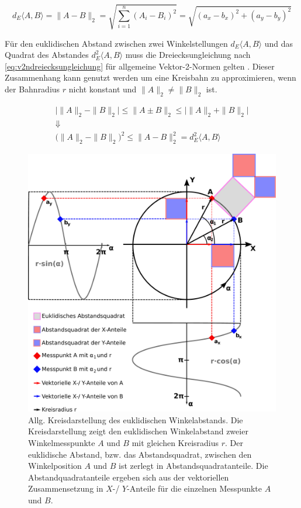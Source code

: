 \begin{equation}\label{eq:euklidischerabstand}
	d_E\langle A,B \rangle = \|A - B\|_2 = \sqrt{\sum_{i=1}^{n}(A_i - B_i)^2} = \sqrt{(a_x - b_x)^2 + (a_y - b_y)^2}
\end{equation}


\clearpage


Für den euklidischen Abstand zwischen zwei Winkelstellungen $d_E\langle A,B \rangle$ und das Quadrat des Abstandes 
$d_E^2\langle A,B \rangle$ muss die Dreiecksungleichung nach \autoref{eq:v2ndreiecksungleichung} für allgemeine 
Vektor-2-Normen gelten \cite{vandeGeijn2014}. Dieser Zusammenhang kann genutzt werden um eine Kreisbahn zu 
approximieren, wenn der Bahnradius $r$ nicht konstant und $\|A\|_2 \ne \|B\|_2$ ist. 


\begin{equation}\label{eq:v2ndreiecksungleichung}
	\begin{gathered}
	\big|\|A\|_2 - \|B\|_2\big| \le \|A \pm B\|_2 \le \big|\|A\|_2 + \|B\|_2\big| \\
	\Downarrow \\
	\big(\|A\|_2 - \|B\|_2\big)^2 \le \|A - B\|_2^2 = d_E^2\langle A,B \rangle
	\end{gathered}
\end{equation}


\begin{figure}[tbph]
	\centering
	\includegraphics[width=0.7\linewidth]{chapters/images/Kreisdarstellung_Winkelabstand}
	\caption[Allg. Kreisdarstellung des euklidischen Winkelabstands]{Allg. Kreisdarstellung des euklidischen 
	Winkelabstands. Die Kreisdarstellung zeigt den euklidischen Winkelabstand zweier Winkelmesspunkte $A$ und $B$ 
	mit gleichen Kreisradius $r$. Der euklidische Abstand, bzw. das Abstandsquadrat, zwischen den Winkelposition 
	$A$ und	$B$ ist zerlegt in Abstandsquadratanteile. Die Abstandquadratanteile ergeben sich aus der vektoriellen 
	Zusammensetzung in $X$-/ $Y$-Anteile für die einzelnen Messpunkte $A$ und $B$.}
	\label{fig:kreisdarstellungwinkelabstand}
\end{figure}


